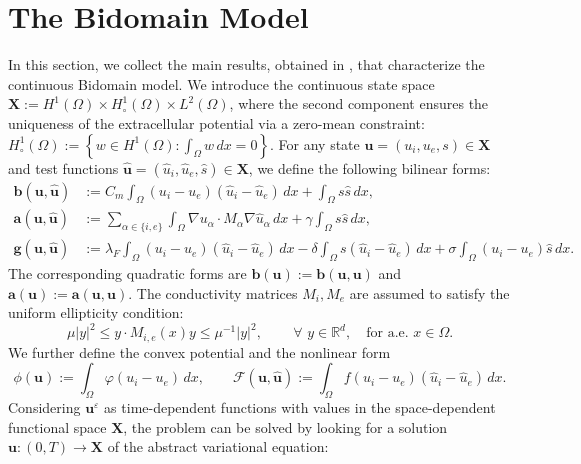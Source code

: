 \documentclass[a4paper,11pt]{article}
\theoremstyle{definition}
\numberwithin{equation}{section}
\newcommand{\e}{\varepsilon}
\begin{document}
\section{The Bidomain Model}
In this section, we collect the main results, obtained in \cite{CFS02, PSCF05}, that characterize the continuous Bidomain model. %
We introduce the continuous state space $\mathbf{X} := H^1(\Omega) \times H_\circ^1(\Omega) \times L^2(\Omega)$, where the second component ensures the uniqueness of the extracellular potential via a zero-mean constraint:
\(
H_\circ^1(\Omega) := \left\{ w \in H^1(\Omega) : \int_{\Omega} w \, dx = 0 \right\}.
\)
For any state $\mathbf{u} = (u_i, u_e, s) \in \mathbf{X}$ and test functions $\widehat{\mathbf{u}} = (\widehat u_i, \widehat u_e, \widehat s) \in \mathbf{X}$, we define the following bilinear forms:
\begin{align*}
	\mathbf{b}(\mathbf{u}, \widehat{\mathbf{u}}) &:= C_m \int_\Omega (u_i - u_e)(\widehat{u}_i - \widehat{u}_e) \, dx + \int_\Omega s \widehat{s} \, dx, \\%
	\mathbf{a}(\mathbf{u}, \widehat{\mathbf{u}}) &:= \sum_{\alpha \in \{i,e\}} \int_\Omega \nabla u_\alpha \cdot M_\alpha \nabla \widehat u_\alpha \, dx + \gamma \int_\Omega s \widehat s \, dx, \\%
	\mathbf{g}(\mathbf{u}, \widehat{\mathbf{u}}) &:= \lambda_F \int_\Omega (u_i - u_e)(\widehat{u}_i - \widehat{u}_e) \, dx - \delta \int_\Omega s (\widehat{u}_i - \widehat{u}_e) \, dx + \sigma \int_\Omega (u_i - u_e) \widehat{s} \, dx.
\end{align*}
The corresponding quadratic forms are $\mathbf{b}(\mathbf u):=\mathbf{b}(\mathbf{u}, \mathbf{u})$ and $\mathbf{a}(\mathbf u):=\mathbf{a}(\mathbf{u}, \mathbf{u})$. The conductivity matrices $M_i, M_e$ are assumed to satisfy the uniform ellipticity condition:
\[
\mu |y|^2 \le y \cdot M_{i,e}(x) y \le \mu^{-1} |y|^2, \qquad \, \forall\,\,y \in \mathbb{R}^d,\quad \text{for a.e. }x\in \Omega.
\]
We further define the convex potential and the nonlinear form
\[
\phi(\mathbf{u}) := \displaystyle\int_\Omega \varphi(u_i - u_e) \, dx,\qquad 
\mathcal{F}(\mathbf{u}, \widehat{\mathbf{u}}) := \displaystyle\int_\Omega f(u_i - u_e)(\widehat{u}_i - \widehat{u}_e) \, dx.
\]
Considering $\mathbf{u}^\e$ as time-dependent functions with values in the space-dependent functional space $\mathbf{X}$, the problem can be solved by looking for a solution $\mathbf{u}: (0,T) \to \mathbf{X}$ of the abstract variational equation:
\end{document}
